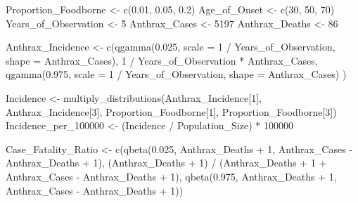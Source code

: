 \documentclass[
  letterpaper,
  DIV=11,
  numbers=noendperiod]{scrartcl}
\newenvironment{Shaded}{\begin{snugshade}}{\end{snugshade}}
\newcommand{\AttributeTok}[1]{\textcolor[rgb]{0.40,0.45,0.13}{#1}}
\newcommand{\DecValTok}[1]{\textcolor[rgb]{0.68,0.00,0.00}{#1}}
\newcommand{\FloatTok}[1]{\textcolor[rgb]{0.68,0.00,0.00}{#1}}
\newcommand{\FunctionTok}[1]{\textcolor[rgb]{0.28,0.35,0.67}{#1}}
\newcommand{\NormalTok}[1]{\textcolor[rgb]{0.00,0.23,0.31}{#1}}
\newcommand{\OtherTok}[1]{\textcolor[rgb]{0.00,0.23,0.31}{#1}}
\newcommand{\SpecialCharTok}[1]{\textcolor[rgb]{0.37,0.37,0.37}{#1}}
\begin{document}
\begin{Shaded}
\begin{Highlighting}[]
\NormalTok{Proportion\_Foodborne }\OtherTok{\textless{}{-}} \FunctionTok{c}\NormalTok{(}\FloatTok{0.01}\NormalTok{, }\FloatTok{0.05}\NormalTok{, }\FloatTok{0.2}\NormalTok{)}
\NormalTok{Age\_of\_Onset }\OtherTok{\textless{}{-}} \FunctionTok{c}\NormalTok{(}\DecValTok{30}\NormalTok{, }\DecValTok{50}\NormalTok{, }\DecValTok{70}\NormalTok{)}
\NormalTok{Years\_of\_Observation }\OtherTok{\textless{}{-}} \DecValTok{5}
\NormalTok{Anthrax\_Cases }\OtherTok{\textless{}{-}} \DecValTok{5197}
\NormalTok{Anthrax\_Deaths }\OtherTok{\textless{}{-}} \DecValTok{86}

\NormalTok{Anthrax\_Incidence }\OtherTok{\textless{}{-}} \FunctionTok{c}\NormalTok{(}\FunctionTok{qgamma}\NormalTok{(}\FloatTok{0.025}\NormalTok{,  }\AttributeTok{scale =} \DecValTok{1} \SpecialCharTok{/}\NormalTok{ Years\_of\_Observation,  }\AttributeTok{shape =}\NormalTok{ Anthrax\_Cases), }
      \DecValTok{1} \SpecialCharTok{/}\NormalTok{ Years\_of\_Observation }\SpecialCharTok{*}\NormalTok{ Anthrax\_Cases, }
      \FunctionTok{qgamma}\NormalTok{(}\FloatTok{0.975}\NormalTok{,  }\AttributeTok{scale =} \DecValTok{1} \SpecialCharTok{/}\NormalTok{ Years\_of\_Observation,  }\AttributeTok{shape =}\NormalTok{ Anthrax\_Cases)}
\NormalTok{      )}

\NormalTok{Incidence }\OtherTok{\textless{}{-}} \FunctionTok{multiply\_distributions}\NormalTok{(Anthrax\_Incidence[}\DecValTok{1}\NormalTok{],  Anthrax\_Incidence[}\DecValTok{3}\NormalTok{],  Proportion\_Foodborne[}\DecValTok{1}\NormalTok{],  Proportion\_Foodborne[}\DecValTok{3}\NormalTok{])}
\NormalTok{Incidence\_per\_100000 }\OtherTok{\textless{}{-}}\NormalTok{ (Incidence }\SpecialCharTok{/}\NormalTok{ Population\_Size) }\SpecialCharTok{*} \DecValTok{100000}

\NormalTok{Case\_Fatality\_Ratio }\OtherTok{\textless{}{-}} \FunctionTok{c}\NormalTok{(}\FunctionTok{qbeta}\NormalTok{(}\FloatTok{0.025}\NormalTok{,  Anthrax\_Deaths }\SpecialCharTok{+} \DecValTok{1}\NormalTok{,  Anthrax\_Cases }\SpecialCharTok{{-}}\NormalTok{ Anthrax\_Deaths }\SpecialCharTok{+} \DecValTok{1}\NormalTok{), }
\NormalTok{       (Anthrax\_Deaths }\SpecialCharTok{+} \DecValTok{1}\NormalTok{)  }\SpecialCharTok{/}\NormalTok{  (Anthrax\_Deaths }\SpecialCharTok{+} \DecValTok{1} \SpecialCharTok{+}\NormalTok{ Anthrax\_Cases }\SpecialCharTok{{-}}\NormalTok{ Anthrax\_Deaths }\SpecialCharTok{+} \DecValTok{1}\NormalTok{), }
       \FunctionTok{qbeta}\NormalTok{(}\FloatTok{0.975}\NormalTok{,  Anthrax\_Deaths }\SpecialCharTok{+} \DecValTok{1}\NormalTok{,  Anthrax\_Cases }\SpecialCharTok{{-}}\NormalTok{ Anthrax\_Deaths }\SpecialCharTok{+} \DecValTok{1}\NormalTok{))}


\end{Highlighting}
\end{Shaded}
\end{document}
